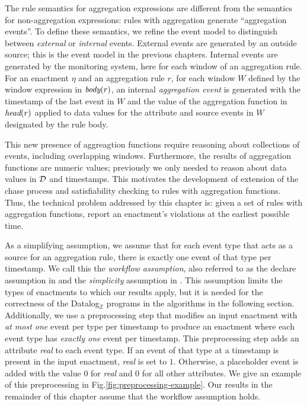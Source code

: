 The rule semantics for aggregation expressions
are different from the semantics for non-aggregation expressions:
rules with aggregation generate ``aggregation events''.
To define these semantics,
we refine the event model
to distinguish between {\em external} or {\em internal} events.
External events are generated by an outside source;
this is the event model in the previous chapters.
Internal events are generated by the monitoring system,
here for each window of an aggregation rule.
For an enactment $\eta$ and an aggregation rule $r$,
for each window $W$ defined by the window expression in $\mbox{\em body}(r)$,
an internal {\em aggregation event} is generated
with the timestamp of the last event in $W$
and the value of the aggregation function in $\mbox{\em head}(r)$
applied to data values for the attribute
and source events in $W$ designated by the rule body.

This new presence of aggreagtion functions
require reasoning about collections of events,
including overlapping windows.
Furthermore,
the results of aggregation functions
are numeric values;
previously we only needed to reason about data values in $\mathcal{D}$
and timestamps.
This motivates the development of extension of the chase process
and satisfiability checking
to rules with aggregation functions.
Thus, the technical problem addressed by this chapter is:
given a set of rules
with aggregation functions,
report an enactment's violations
at the earliest possible time.

As a simplifying assumption,
we assume that for each event type
that acts as a source for an aggregation rule,
there is exactly one event of that type per timestamp.
We call this the {\em workflow assumption},
also referred to as the {\sc declare} assumption in \cite{de2014reasoning}
and the {\em simplicity} assumption in \cite{chiariello2023ltl}.
This assumption limits the types of enactments
to which our results apply,
but it is needed for the correctness of the Datalog$_{\mathbb{Z}}$ programs
in the algorithms in the following section.
Additionally,
we use a preprocessing step that modifies an input enactment
with {\em at most one} event per type per timestamp
to produce an enactment where each event type has {\em exactly one} event per timestamp.
This preprocessing step
adds an attribute {\em real} to each event type.
If an event of that type at a timestamp is present in the input enactment,
{\em real} is set to $1$.
Otherwise,
a placeholder event is added with the value $0$ for {\em real}
and $0$ for all other attributes.
We give an example of this preprocessing in Fig.\:\ref{fig:preprocessing-example}.
Our results in the remainder of this chapter
assume that the workflow assumption holds.

